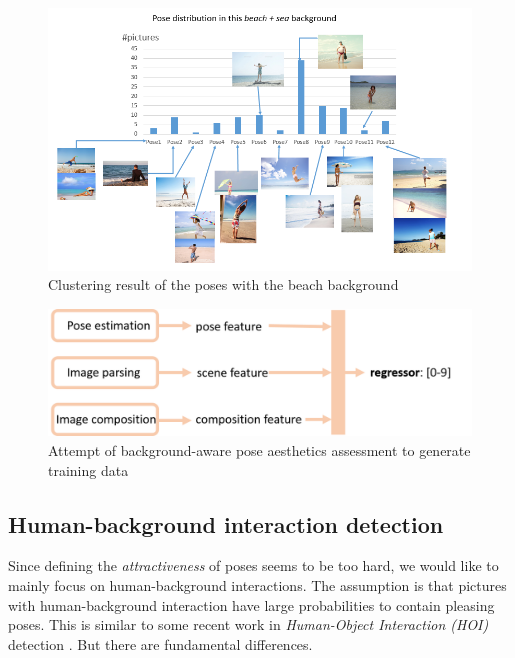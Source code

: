 \documentclass{article}
\begin{document}
\begin{figure}
        \centering
        \includegraphics[scale=0.6]{figure/pose}
        \caption{Clustering result of the poses with the beach background}
        \label{cluster}
\end{figure}

\begin{figure}
        \centering
        \includegraphics[scale=0.4]{figure/feature.png}
        \caption{Attempt of background-aware pose aesthetics assessment to generate training data}
        \label{cluster}
\end{figure}

\subsection{Human-background interaction detection}

Since defining the \emph{attractiveness} of poses seems to be too hard, we would like to mainly focus on human-background interactions. The assumption is that pictures with human-background interaction have large probabilities to contain pleasing poses. This is similar to some recent work in \emph{Human-Object Interaction (HOI)} detection \cite{chao:wacv2018}. But there are fundamental differences. 
\end{document}
